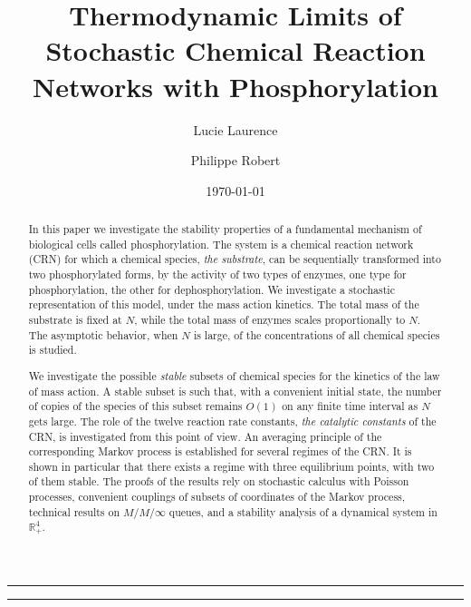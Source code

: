 \documentclass[english]{amsart}
\title[Thermodynamic Limits of CRN]{Thermodynamic Limits of Stochastic Chemical Reaction Networks with Phosphorylation}
\date{\today}
\author[L. Laurence]{Lucie Laurence}
\author[Ph. Robert]{Philippe Robert}
\newcommand{\R}{\ensuremath{\mathbb{R}}}
\numberwithin{proposition}{section}
\begin{document}
\begin{abstract}
  In this paper we investigate the stability properties of a fundamental mechanism of biological cells called phosphorylation. The system is a chemical reaction network  (CRN) for which  a chemical species, {\em the substrate},  can be sequentially transformed into two phosphorylated forms, by the activity of two types of enzymes, one type for phosphorylation, the other for dephosphorylation. We investigate a stochastic representation of this model, under the mass action kinetics. The total mass of the substrate is fixed at $N$, while the total mass of enzymes scales proportionally to $N$. The asymptotic behavior, when $N$ is large, of the concentrations of all chemical species is studied. 
	
We investigate the possible {\em stable} subsets of chemical species for the kinetics of the law of mass action. A stable subset is such that, with a convenient initial state, the number of copies of the  species of this subset remains $O(1)$ on any finite time interval as $N$ gets large. The role of the twelve reaction rate constants, {\em the catalytic constants} of the CRN,  is investigated from this point of view. An averaging principle of the corresponding Markov process is established for several regimes of the CRN. It is shown in particular that there exists a regime with three equilibrium points, with two of them stable. The proofs of the results rely on stochastic calculus with Poisson processes, convenient couplings of subsets of coordinates of the Markov process, technical results on $M/M/\infty$ queues, and a stability analysis of a dynamical system in $\R_+^4$. 
\end{abstract}
\maketitle

 \vspace{-5mm}

\bigskip

\hrule

\vspace{-3mm}

\tableofcontents

\vspace{-1cm}

\hrule

\bigskip
\end{document}
